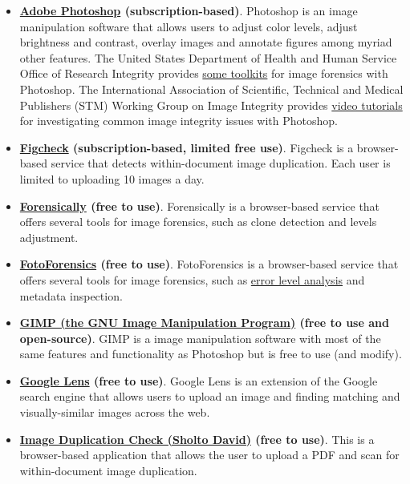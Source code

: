 \documentclass[letterpaper, 12pt]{article}
\begin{document}
\begin{itemize}
    \setlength\itemsep{-0.5em}
    \item \textbf{\href{https://www.adobe.com/products/photoshop.html}{Adobe Photoshop} (subscription-based)}. Photoshop is an image manipulation software that allows users to adjust color levels, adjust brightness and contrast, overlay images and annotate figures among myriad other features. The United States Department of Health and Human Service Office of Research Integrity provides \href{https://ori.hhs.gov/advanced-forensic-actions}{some toolkits} for image forensics with Photoshop. The International Association of Scientific, Technical and Medical Publishers (STM) Working Group on Image Integrity provides \href{https://stm-assoc.org/what-we-do/strategic-areas/research-integrity/image-integrity/resource-center/}{video tutorials} for investigating common image integrity issues with Photoshop.
    \item \textbf{\href{https://www.figcheck.com/imagecheck}{Figcheck} (subscription-based, limited free use)}. Figcheck is a browser-based service that detects within-document image duplication. Each user is limited to uploading 10 images a day.
    \item \textbf{\href{https://29a.ch/photo-forensics/}{Forensically} (free to use)}. Forensically is a browser-based service that offers several tools for image forensics, such as clone detection and levels adjustment.
    \item \textbf{\href{https://fotoforensics.com/}{FotoForensics} (free to use)}. FotoForensics is a browser-based service that offers several tools for image forensics, such as \href{https://en.wikipedia.org/wiki/Error_level_analysis}{error level analysis} and metadata inspection.
    \item \textbf{\href{https://www.gimp.org/}{GIMP (the GNU Image Manipulation Program)} (free to use and open-source)}. GIMP is a image manipulation software with most of the same features and functionality as Photoshop but is free to use (and modify).
    \item \textbf{\href{https://www.google.com/?olud=}{Google Lens} (free to use)}. Google Lens is an extension of the Google search engine that allows users to upload an image and finding matching and visually-similar images across the web.
    \item \textbf{\href{https://sholtodavid.pythonanywhere.com/}{Image Duplication Check (Sholto David)} (free to use)}. This is a browser-based application that allows the user to upload a PDF and scan for within-document image duplication. 

\end{itemize}
\end{document}
